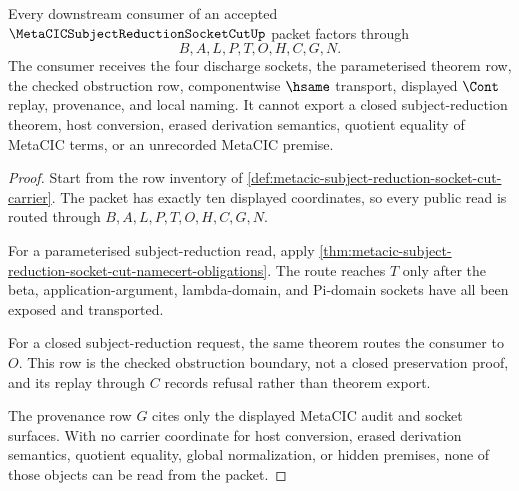 \begin{theorem}
\label{thm:metacic-subject-reduction-socket-cut-nonescape}
Every downstream consumer of an accepted $\MetaCICSubjectReductionSocketCutUp$ packet factors through
$$
B,A,L,P,T,O,H,C,G,N.
$$
The consumer receives the four discharge sockets, the parameterised theorem row, the checked obstruction row, componentwise $\hsame$ transport, displayed $\Cont$ replay, provenance, and local naming. It cannot export a closed subject-reduction theorem, host conversion, erased derivation semantics, quotient equality of MetaCIC terms, or an unrecorded MetaCIC premise.
\end{theorem}
\begin{proof}
Start from the row inventory of \autoref{def:metacic-subject-reduction-socket-cut-carrier}. The packet has exactly ten displayed coordinates, so every public read is routed through $B,A,L,P,T,O,H,C,G,N$.

For a parameterised subject-reduction read, apply \autoref{thm:metacic-subject-reduction-socket-cut-namecert-obligations}. The route reaches $T$ only after the beta, application-argument, lambda-domain, and Pi-domain sockets have all been exposed and transported.

For a closed subject-reduction request, the same theorem routes the consumer to $O$. This row is the checked obstruction boundary, not a closed preservation proof, and its replay through $C$ records refusal rather than theorem export.

The provenance row $G$ cites only the displayed MetaCIC audit and socket surfaces. With no carrier coordinate for host conversion, erased derivation semantics, quotient equality, global normalization, or hidden premises, none of those objects can be read from the packet.
\end{proof}


